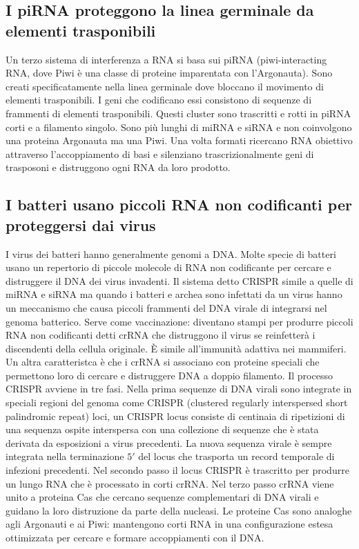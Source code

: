 \subsection{I piRNA proteggono la linea germinale da elementi trasponibili}
Un terzo sistema di interferenza a RNA si basa sui piRNA (piwi-interacting RNA, dove Piwi \`e una classe di proteine imparentata con l'Argonauta). Sono creati specificatamente nella
linea germinale dove bloccano il movimento di elementi trasponibili. I geni che codificano essi consistono di sequenze di frammenti di elementi trasponibili. Questi cluster sono 
trascritti e rotti in piRNA corti e a filamento singolo. Sono pi\`u lunghi di miRNA e siRNA e non coinvolgono una proteina Argonauta ma una Piwi. Una volta formati ricercano RNA obiettivo
attraverso l'accoppiamento di basi e silenziano trascrizionalmente geni di trasposoni e distruggono ogni RNA da loro prodotto. 
\subsection{I batteri usano piccoli RNA non codificanti per proteggersi dai virus}
I virus dei batteri hanno generalmente genomi a DNA. Molte specie di batteri usano un repertorio di piccole molecole di RNA non codificante per cercare e distruggere il DNA dei virus
invadenti. Il sistema detto CRISPR simile a quelle di miRNA e siRNA ma quando i batteri e archea sono infettati da un virus hanno un meccanismo che causa piccoli frammenti del
DNA virale di integrarsi nel genoma batterico. Serve come vaccinazione: diventano stampi per produrre piccoli RNA non codificanti detti crRNA che distruggono il virus se reinfetter\`a
i discendenti della cellula originale. \`E simile all'immunit\`a adattiva nei mammiferi. Un altra caratteristca \`e che i crRNA si associano con proteine speciali che permettono loro di
cercare e distruggere DNA a doppio filamento. Il processo CRISPR avviene in tre fasi. Nella prima sequenze di DNA virali sono integrate in speciali regioni del genoma come CRISPR
(clustered regularly interspersed short palindromic repeat) loci, un CRISPR locus consiste di centinaia di ripetizioni di una sequenza ospite interspersa con una collezione di sequenze
che \`e stata derivata da esposizioni a virus precedenti. La nuova sequenza virale \`e sempre integrata nella terminazione $5'$ del locus che trasporta un record temporale di 
infezioni precedenti. Nel secondo passo il locus CRISPR \`e trascritto per produrre un lungo RNA che \`e processato in corti crRNA. Nel terzo passo crRNA viene unito a proteina Cas che
cercano sequenze complementari di DNA virali e guidano la loro distruzione da parte della nucleasi. Le proteine Cas sono analoghe agli Argonauti e ai Piwi: mantengono corti RNA in 
una configurazione estesa ottimizzata per cercare e formare accoppiamenti con il DNA. 
